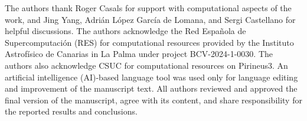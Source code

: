 \documentclass[journal=jpcbfk,manuscript=article]{achemso}
\begin{document}
\begin{acknowledgement}

The authors thank Roger Casals for support with computational aspects of the work, and Jing Yang, Adrián López García de Lomana, and Sergi Castellano for helpful discussions. The authors acknowledge the Red Española de Supercomputación (RES) for computational resources provided by the Instituto Astrofísico de Canarias in La Palma under project BCV-2024-1-0030. The authors also acknowledge CSUC for computational resources on Pirineus3. An artificial intelligence (AI)-based language tool was used only for language editing and improvement of the manuscript text. All authors reviewed and approved the final version of the manuscript, agree with its content, and share responsibility for the reported results and conclusions.

\end{acknowledgement}


\end{document}
